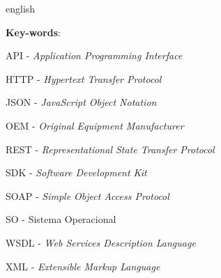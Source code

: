 \begin{resumo}[Abstract]
 \begin{otherlanguage*}{english}
 
   \vspace{\onelineskip}
 
   \noindent 
   \textbf{Key-words}:
 \end{otherlanguage*}
\end{resumo}


\listoffigures*



\begin{siglas}
\item API - \textit{Application Programming Interface}
\item HTTP - \textit{Hypertext Transfer Protocol}
\item JSON - \textit{JavaScript Object Notation}
\item OEM - \textit{Original Equipment Manufacturer}
\item REST - \textit{Representational State Transfer Protocol}
\item SDK - \textit{Software Development Kit}
\item  SOAP - \textit{Simple Object Access Protocol}
\item SO - Sistema Operacional
\item WSDL - \textit{Web Services Description Language}
\item XML - \textit{Extensible Markup Language}
  
  
  
\end{siglas}


\tableofcontents*
\cleardoublepage

